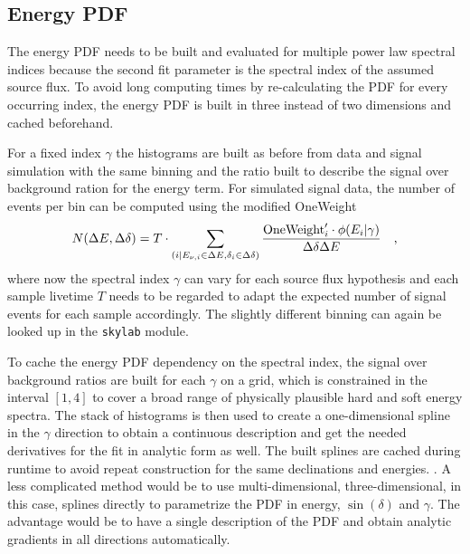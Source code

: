 \subsection*{Energy PDF}
The energy PDF needs to be built and evaluated for multiple power law spectral indices because the second fit parameter is the spectral index of the assumed source flux.
To avoid long computing times by re-calculating the PDF for every occurring index, the energy PDF is built in three instead of two dimensions and cached beforehand.

For a fixed index $\gamma$ the histograms are built as before from data and signal simulation with the same binning and the ratio built to describe the signal over background ration for the energy term.
For simulated signal data, the number of events per bin can be computed using the modified OneWeight
\begin{equation}
  N(\Delta E, \Delta\delta)
  = T\cdot \sum_{(i|E_{\nu,i}\in\Delta E, \delta_i\in\Delta\delta)}
    \frac{\text{OneWeight}'_i \cdot \phi(E_i|\gamma)}{\Delta\delta \Delta E}
  \quad\text{,}
\end{equation}
where now the spectral index $\gamma$ can vary for each source flux hypothesis and each sample livetime $T$ needs to be regarded to adapt the expected number of signal events for each sample accordingly.
The slightly different binning can again be looked up in the \lstinline!skylab! module.

To cache the energy PDF dependency on the spectral index, the signal over background ratios are built for each $\gamma$ on a grid, which is constrained in the interval $[1, 4]$ to cover a broad range of physically plausible hard and soft energy spectra.
The stack of histograms is then used to create a one-dimensional spline in the $\gamma$ direction to obtain a continuous description and get the needed derivatives for the fit in analytic form as well.
The built splines are cached during runtime to avoid repeat construction for the same declinations and energies.
.
A less complicated method would be to use multi-dimensional, three-dimensional, in this case, splines directly to parametrize the PDF in energy, $\sin(\delta)$ and $\gamma$.
The advantage would be to have a single description of the PDF and obtain analytic gradients in all directions automatically.


